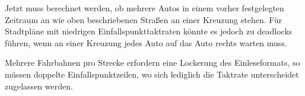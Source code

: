 Jetzt muss berechnet werden, ob mehrere Autos in einem vorher festgelegten Zeitraum an wie oben beschriebenen Straßen an einer Kreuzung stehen.
Für Stadtpläne mit niedrigen Einfallspunkttaktraten könnte es jedoch zu deadlocks führen, wenn an einer Kreuzung jedes Auto auf das Auto rechts warten muss.

Mehrere Fahrbahnen pro Strecke erfordern eine Lockerung des Einleseformats,
so müssen doppelte Einfallspunktzeilen, wo sich lediglich die Taktrate unterscheidet zugelassen werden. 
